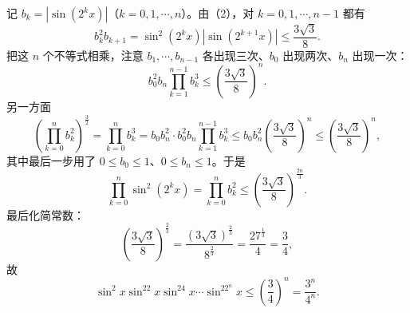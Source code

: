 \begin{answer}

记 $b_k=\left|\sin\left(2^kx\right)\right|$（$k=0,1,\cdots,n$）。由（2），对 $k=0,1,\cdots,n-1$ 都有
\nopagebreak[4]
\[b_k^2b_{k+1}=\sin^2\left(2^kx\right)\left|\sin\left(2^{k+1}x\right)\right|\leqslant\frac{3\sqrt3}8 .\]
把这 $n$ 个不等式相乘，注意 $b_1,\cdots,b_{n-1}$ 各出现三次、$b_0$ 出现两次、$b_n$ 出现一次：
\nopagebreak[4]
\[b_0^2b_n\prod_{k=1}^{n-1}b_k^3\leqslant\left(\frac{3\sqrt3}8\right)^n .\]
另一方面
\nopagebreak[4]
\[\left(\prod_{k=0}^{n}b_k^2\right)^{\frac32}=\prod_{k=0}^{n}b_k^3=b_0b_n^2\cdot b_0^2b_n\prod_{k=1}^{n-1}b_k^3
\leqslant b_0b_n^2\left(\frac{3\sqrt3}8\right)^n\leqslant\left(\frac{3\sqrt3}8\right)^n,\]
其中最后一步用了 $0\leqslant b_0\leqslant1$、$0\leqslant b_n\leqslant1$。于是
\nopagebreak[4]
\[\prod_{k=0}^{n}\sin^2\left(2^kx\right)=\prod_{k=0}^{n}b_k^2\leqslant\left(\frac{3\sqrt3}8\right)^{\frac{2n}3} .\]
最后化简常数：
\nopagebreak[4]
\[\left(\frac{3\sqrt3}8\right)^{\frac23}=\frac{\left(3\sqrt3\right)^{\frac23}}{8^{\frac23}}=\frac{27^{\frac13}}{4}=\frac34,\]
故
\nopagebreak[4]
\[\sin^2x\sin^22x\sin^24x\cdots\sin^22^nx\leqslant\left(\frac34\right)^n=\frac{3^n}{4^n} .\]




\end{answer}
